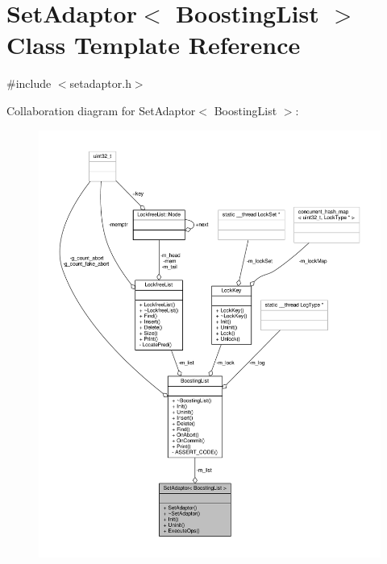 \hypertarget{classSetAdaptor_3_01BoostingList_01_4}{\section{Set\-Adaptor$<$ Boosting\-List $>$ Class Template Reference}
\label{classSetAdaptor_3_01BoostingList_01_4}
}


{\ttfamily \#include $<$setadaptor.\-h$>$}



Collaboration diagram for Set\-Adaptor$<$ Boosting\-List $>$\-:
\nopagebreak
\begin{figure}[H]
\begin{center}
\leavevmode
\includegraphics[width=350pt]{classSetAdaptor_3_01BoostingList_01_4__coll__graph}
\end{center}
\end{figure}
